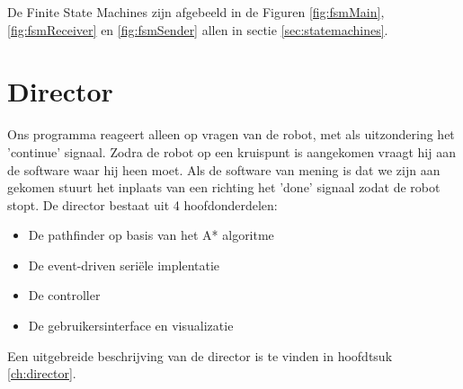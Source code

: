 \documentclass{report}
\begin{document}
De Finite State Machines zijn afgebeeld in de Figuren \ref{fig:fsmMain}, \ref{fig:fsmReceiver} en \ref{fig:fsmSender} allen in sectie \ref{sec:statemachines}.

\section{Director}
Ons programma reageert alleen op vragen van de robot, met als uitzondering het 'continue' signaal.
Zodra de robot op een kruispunt is aangekomen vraagt hij aan de software waar hij heen moet.
Als de software van mening is dat we zijn aan gekomen stuurt het inplaats van een richting het 'done' signaal zodat de robot stopt.
De director bestaat uit 4 hoofdonderdelen:
\begin{itemize}
\item De pathfinder op basis van het A* algoritme
\item De event-driven seriële implentatie
\item De controller
\item De gebruikersinterface en visualizatie
\end{itemize}
Een uitgebreide beschrijving van de director is te vinden in hoofdtsuk \ref{ch:director}.
\end{document}
